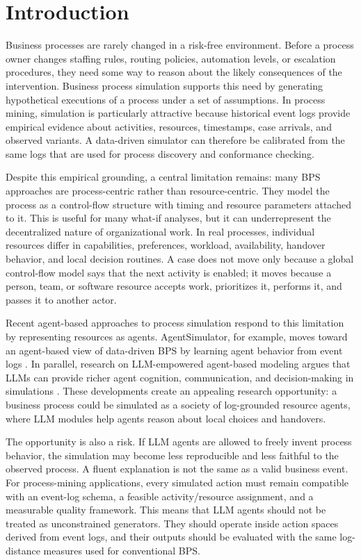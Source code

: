 \section{Introduction}\label{introduction}

Business processes are rarely changed in a risk-free environment. Before
a process owner changes staffing rules, routing policies, automation
levels, or escalation procedures, they need some way to reason about the
likely consequences of the intervention. Business process simulation
supports this need by generating hypothetical executions of a process
under a set of assumptions. In process mining, simulation is
particularly attractive because historical event logs provide empirical
evidence about activities, resources, timestamps, case arrivals, and
observed variants. A data-driven simulator can therefore be calibrated
from the same logs that are used for process discovery and conformance
checking.

Despite this empirical grounding, a central limitation remains: many BPS
approaches are process-centric rather than resource-centric. They model
the process as a control-flow structure with timing and resource
parameters attached to it. This is useful for many what-if analyses, but
it can underrepresent the decentralized nature of organizational work.
In real processes, individual resources differ in capabilities,
preferences, workload, availability, handover behavior, and local
decision routines. A case does not move only because a global
control-flow model says that the next activity is enabled; it moves
because a person, team, or software resource accepts work, prioritizes
it, performs it, and passes it to another actor.

Recent agent-based approaches to process simulation respond to this
limitation by representing resources as agents. AgentSimulator, for
example, moves toward an agent-based view of data-driven BPS by learning
agent behavior from event logs \cite{kirchdorfer2024agentsimulator}. In parallel,
research on LLM-empowered agent-based modeling argues that LLMs can
provide richer agent cognition, communication, and decision-making in
simulations \cite{gao2024llmabm}. These developments create an appealing
research opportunity: a business process could be simulated as a society
of log-grounded resource agents, where LLM modules help agents reason
about local choices and handovers.

The opportunity is also a risk. If LLM agents are allowed to freely
invent process behavior, the simulation may become less reproducible and
less faithful to the observed process. A fluent explanation is not the
same as a valid business event. For process-mining applications, every
simulated action must remain compatible with an event-log schema, a
feasible activity/resource assignment, and a measurable quality
framework. This means that LLM agents should not be treated as
unconstrained generators. They should operate inside action spaces
derived from event logs, and their outputs should be evaluated with the
same log-distance measures used for conventional BPS.

